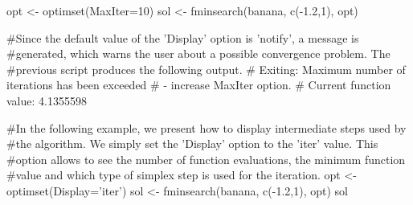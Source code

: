 \begin{Examples}
\begin{ExampleCode}
  opt <- optimset(MaxIter=10)
  sol <- fminsearch(banana, c(-1.2,1), opt)

#Since the default value of the 'Display' option is 'notify', a message is
#generated, which warns the user about a possible convergence problem. The
#previous script produces the following output.
# Exiting: Maximum number of iterations has been exceeded
#          - increase MaxIter option.
#          Current function value: 4.1355598

#In the following example, we present how to display intermediate steps used by
#the algorithm. We simply set the 'Display' option to the 'iter' value. This 
#option allows to see the number of function evaluations, the minimum function
#value and which type of simplex step is used for the iteration.
  opt <- optimset(Display='iter')
  sol <- fminsearch(banana, c(-1.2,1), opt)
  sol
\end{ExampleCode}
\end{Examples}
